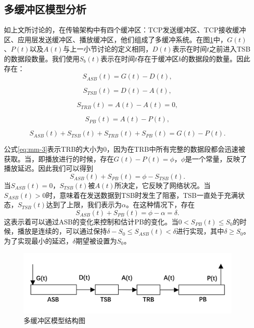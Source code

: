 \subsection{多缓冲区模型分析}

如上文所讨论的，在传输架构中有四个缓冲区：TCP发送缓冲区、TCP接收缓冲区、应用层发送缓冲区、播放缓冲区，他们组成了多缓冲系统。在图\ref{fig:21}中，$G(t)$、$P(t)$以及$A(t)$与上一小节讨论的定义相同，$D(t)$表示在时间$t$之前进入TSB的数据段数量。我们使用$S_b(t)$表示在时间$t$存在于缓冲区$b$的数据段的数量。因此存在：
\begin{equation}
\label{eq:mm-1}
S_{ASB}(t)=G(t)-D(t),
\end{equation}

\begin{equation}
\label{eq:mm-2}
S_{TSB}(t)=D(t)-A(t),
\end{equation}

\begin{equation}
\label{eq:mm-3}
S_{TRB}(t)=A(t)-A(t)=0,
\end{equation}

\begin{equation}
\label{eq:mm-4}
S_{PB}(t) =A(t)-P(t),
\end{equation}

\begin{equation}
\label{eq:mm-5}
S_{ASB}(t)+S_{TSB}(t)+S_{TRB}(t)+S_{PB}(t)=G(t)-P(t).
\end{equation}


公式\ref{eq:mm-3}表示TRB的大小为0，因为在TRB中所有完整的数据段都会迅速被获取。当，即播放进行的时候，存在$G(t)-P(t)=\phi$，$\phi$是一个常量，反映了播放延迟。因此我们可以得到
\begin{equation}
\label{eq:mm-6}
S_{ASB}(t)+S_{PB}(t)=\phi-S_{TSB}(t).
\end{equation}
当$S_{ASB}(t)=0$，$S_{TSB}(t)$被$A(t)$所决定，它反映了网络状况。当$S_{ASB}(t)>0$时，意味着在发送数据到TSB时发生了阻塞，TSB一直处于充满状态，$S_{TSB}(t)$达到了上限，我们表示为$\alpha$。在这种情况下，存在
\begin{equation}
\label{eq:mm-7}
S_{ASB}(t)+S_{PB}(t)=\phi-\alpha=\delta.
\end{equation}
这表示着可以通过ASB的变化来控制和估计PB的变化。当$0 < S_{PB}(t) \le S_0$的时候，播放是连续的，可以通过保持$\delta - S_0 \le S_{ASB}(t) < \delta$进行实现，其中$\delta \ge S_0$。为了实现最小的延迟，$\delta$期望被设置为$S_0$。

\begin{figure}[t]
	\centering
	\includegraphics[width = 0.9\linewidth]{clip/21.png}
	\caption{多缓冲区模型结构图\label{fig:21}}
\end{figure}

